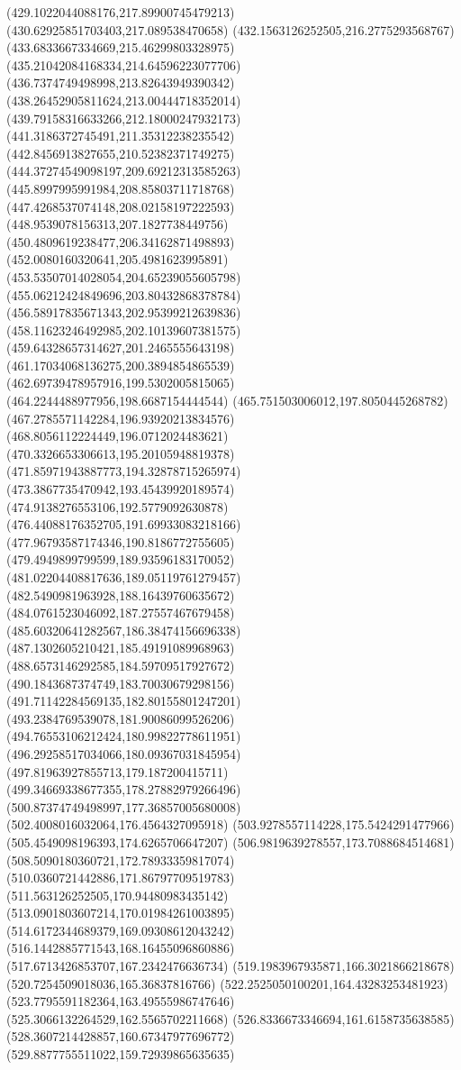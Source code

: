 {(429.1022044088176,217.89900745479213)
(430.62925851703403,217.089538470658)
(432.1563126252505,216.2775293568767)
(433.6833667334669,215.46299803328975)
(435.21042084168334,214.64596223077706)
(436.7374749498998,213.82643949390342)
(438.26452905811624,213.00444718352014)
(439.79158316633266,212.18000247932173)
(441.3186372745491,211.35312238235542)
(442.8456913827655,210.52382371749275)
(444.37274549098197,209.69212313585263)
(445.8997995991984,208.85803711718768)
(447.4268537074148,208.02158197222593)
(448.9539078156313,207.1827738449756)
(450.4809619238477,206.34162871498893)
(452.0080160320641,205.4981623995891)
(453.53507014028054,204.65239055605798)
(455.06212424849696,203.80432868378784)
(456.58917835671343,202.95399212639836)
(458.11623246492985,202.10139607381575)
(459.64328657314627,201.2465555643198)
(461.17034068136275,200.3894854865539)
(462.69739478957916,199.5302005815065)
(464.2244488977956,198.6687154444544)
(465.751503006012,197.8050445268782)
(467.2785571142284,196.93920213834576)
(468.8056112224449,196.0712024483621)
(470.3326653306613,195.20105948819378)
(471.85971943887773,194.32878715265974)
(473.3867735470942,193.45439920189574)
(474.9138276553106,192.5779092630878)
(476.44088176352705,191.69933083218166)
(477.96793587174346,190.8186772755605)
(479.4949899799599,189.93596183170052)
(481.02204408817636,189.05119761279457)
(482.5490981963928,188.16439760635672)
(484.0761523046092,187.27557467679458)
(485.60320641282567,186.38474156696338)
(487.1302605210421,185.49191089968963)
(488.6573146292585,184.59709517927672)
(490.1843687374749,183.70030679298156)
(491.71142284569135,182.80155801247201)
(493.2384769539078,181.90086099526206)
(494.76553106212424,180.99822778611951)
(496.29258517034066,180.09367031845954)
(497.81963927855713,179.187200415711)
(499.34669338677355,178.27882979266496)
(500.87374749498997,177.36857005680008)
(502.4008016032064,176.4564327095918)
(503.9278557114228,175.5424291477966)
(505.4549098196393,174.6265706647207)
(506.9819639278557,173.7088684514681)
(508.5090180360721,172.78933359817074)
(510.0360721442886,171.86797709519783)
(511.563126252505,170.94480983435142)
(513.0901803607214,170.01984261003895)
(514.6172344689379,169.09308612043242)
(516.1442885771543,168.16455096860886)
(517.6713426853707,167.2342476636734)
(519.1983967935871,166.3021866218678)
(520.7254509018036,165.36837816766)
(522.2525050100201,164.43283253481923)
(523.7795591182364,163.49555986747646)
(525.3066132264529,162.5565702211668)
(526.8336673346694,161.6158735638585)
(528.3607214428857,160.67347977696772)
(529.8877755511022,159.72939865635635)
}
